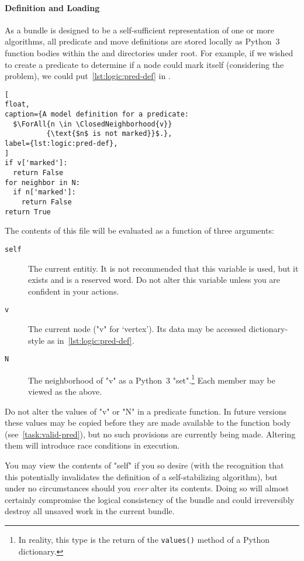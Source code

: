 \paragraph{Definition and Loading}
As a bundle is designed to be
  a self-sufficient representation
  of one or more algorithms,
  all predicate and move definitions are stored locally
  as Python~3 function bodies within the
   and  directories
  under root.
For example, if we wished to create a predicate
  to determine if a node could mark itself
  (considering the  problem),
  we could put~\autoref{lst:logic:pred-def} in
  .
\begin{lstlisting}[
float,
caption={A model definition for a predicate:
  $\ForAll{n \in \ClosedNeighborhood{v}}
          {\text{$n$ is not marked}}$.},
label={lst:logic:pred-def},
]
if v['marked']:
  return False
for neighbor in N:
  if n['marked']:
    return False
return True
\end{lstlisting} %
The contents of this file will be evaluated as
  a function of three arguments:
\begin{description}
\item[\texttt{self}] The current entitiy.
  It is not recommended that this variable is used,
    but it exists and is a reserved word.
  Do not alter this variable unless you are confident in your actions.
\item[\texttt{v}] The current node ("v" for \enquote*{vertex}).
  Its data may be accessed dictionary-style as in~\autoref{lst:logic:pred-def}.
\item[\texttt{N}] The neighborhood of "v" as a Python~3 "set".\footnote{%
    In reality, this type is the return of the \texttt{values()} method of a Python dictionary.}
  Each member may be viewed as the above.
\end{description} %
\begin{warning}
  Do not alter the values of "v" or "N" in a predicate function.
  In future versions these values may be copied
    before they are made available to the function body (see~\autoref{task:valid-pred}),
    but no such provisions are currently being made.
  Altering them will introduce race conditions in execution.
\end{warning} %
\begin{warning}
  You may view the contents of "self" if you so desire
    (with the recognition that this potentially invalidates
    the definition of a self-stabilizing algorithm),
  but under no circumstances should you \emph{ever} alter its contents.
  Doing so will almost certainly compromise the logical consistency
    of the bundle and could irreversibly destroy all unsaved work
    in the current bundle.
\end{warning} %
